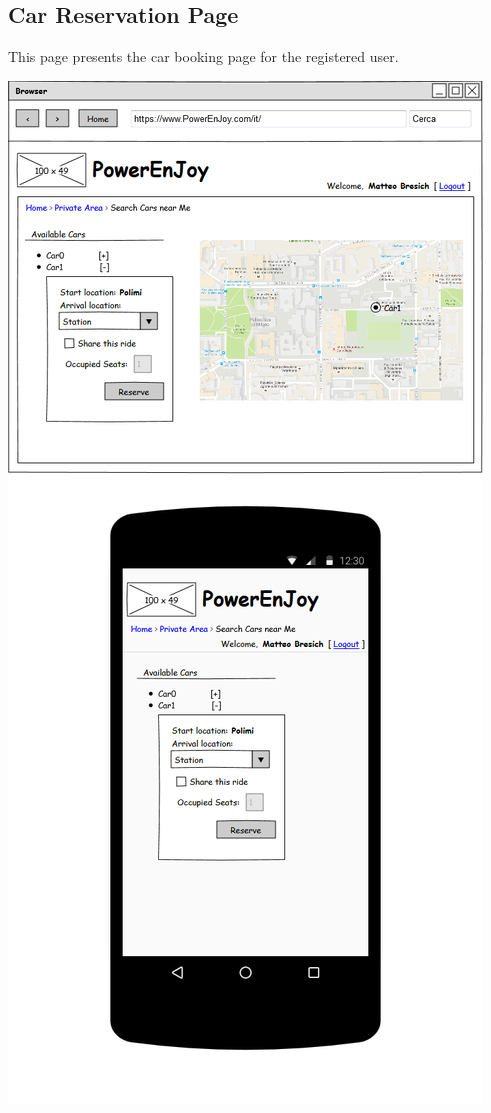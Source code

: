 \subsection{Car Reservation Page} This page presents the car booking page for the registered user.
\begin{center}
	\includegraphics[width=0.6\linewidth]{"img/ui/search-car"}
\end{center}
\pagebreak

